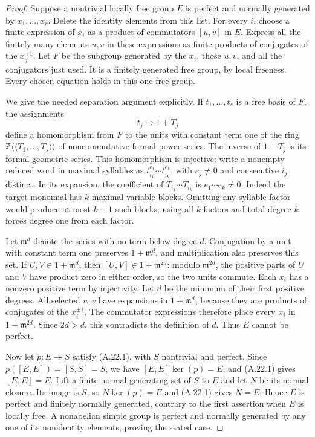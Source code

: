 \begin{proof}
Suppose a nontrivial locally free group $E$ is perfect and normally
generated by $x_1,\ldots,x_r$. Delete the identity elements from this
list. For every $i$, choose a finite expression of $x_i$ as a product
of commutators $[u,v]$ in $E$. Express all the finitely many elements
$u,v$ in these expressions as finite products of conjugates of the
$x_j^{\pm1}$. Let $F$ be the subgroup generated by the $x_i$, those
$u,v$, and all the conjugators just used. It is a finitely generated
free group, by local freeness. Every chosen equation holds in this
one free group.

We give the needed separation argument explicitly. If
$t_1,\ldots,t_s$ is a free basis of $F$, the assignments
\[
 t_j\longmapsto 1+T_j
\]
define a homomorphism from $F$ to the units with constant term one
of the ring $\mathbb Z\langle\!\langle T_1,\ldots,T_s
\rangle\!\rangle$ of noncommutative formal power series. The inverse
of $1+T_j$ is its formal geometric series. This homomorphism is
injective: write a nonempty reduced word in maximal syllables as
$t_{i_1}^{e_1}\cdots t_{i_k}^{e_k}$, with $e_j\ne0$ and consecutive
$i_j$ distinct. In its expansion, the coefficient of
$T_{i_1}\cdots T_{i_k}$ is $e_1\cdots e_k\ne0$. Indeed the target
monomial has $k$ maximal variable blocks. Omitting any syllable
factor would produce at most $k-1$ such blocks; using all $k$
factors and total degree $k$ forces degree one from each factor.

Let $\mathfrak m^d$ denote the series with no term below degree
$d$. Conjugation by a unit with constant term one preserves
$1+\mathfrak m^d$, and multiplication also preserves this set.
If $U,V\in1+\mathfrak m^d$, then
$[U,V]\in1+\mathfrak m^{2d}$: modulo $\mathfrak m^{2d}$, the
positive parts of $U$ and $V$ have product zero in either order,
so the two units commute. Each $x_i$ has a nonzero positive term
by injectivity. Let $d$ be the minimum of their first positive
degrees. All selected $u,v$ have expansions in
$1+\mathfrak m^d$, because they are products of conjugates of the
$x_i^{\pm1}$. The commutator expressions therefore place every
$x_i$ in $1+\mathfrak m^{2d}$. Since $2d>d$, this contradicts
the definition of $d$. Thus $E$ cannot be perfect.

Now let $p:E\twoheadrightarrow S$ satisfy (A.22.1), with $S$
nontrivial and perfect. Since $p([E,E])=[S,S]=S$, we have
$[E,E]\ker(p)=E$, and (A.22.1) gives $[E,E]=E$. Lift a finite
normal generating set of $S$ to $E$ and let $N$ be its normal
closure. Its image is $S$, so $N\ker(p)=E$ and (A.22.1) gives
$N=E$. Hence $E$ is perfect and finitely normally generated,
contrary to the first assertion when $E$ is locally free. A
nonabelian simple group is perfect and normally generated by any
one of its nonidentity elements, proving the stated case.


\end{proof}
